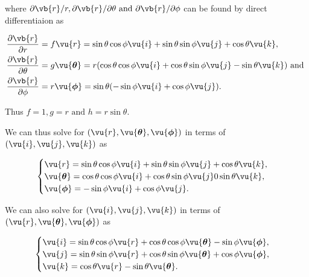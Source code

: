 \documentclass[english,a4paper,12pt]{report}
\begin{document}
where \(\partial \vb{r} /r, \partial \vb{r} /\partial \theta \text { and } \partial \vb{r} /\partial \phi \) can be found by direct differentiaion as 

\begin{equation}
	\begin{aligned} 
		\frac{\partial \vb{r} }{\partial r}   &= f \vu{r} = \sin{\theta}\cos{\phi}\vu{i} + \sin{\theta}\sin{\phi}\vu{j} + \cos{\theta}\vu{k}, \\
		\frac{\partial \vb{r} }{\partial \theta }  &= g \vu{\boldsymbol{\theta }} = r(\cos{\theta}\cos{\phi}\vu{i} + \cos{\theta}\sin{\phi}\vu{j} - \sin{\theta}\vu{k})\text { and }  \\
		\frac{\partial \vb{r} }{\partial \phi }  &= r \vu{\boldsymbol{\phi } } = \sin \theta (-\sin{\phi}\vu{i} + \cos{\phi}\vu{j}). 
	\end{aligned} 
\end{equation}

Thus \(f = 1, g = r \text { and }  h = r\sin \theta \).

We can thus solve for \((\vu{r} , \vu{\boldsymbol{\theta } }, \vu{\boldsymbol{\phi } })\) in terms of \((\vu{i}, \vu{j} ,\vu{k} )\) as 

\begin{equation}
    \begin{cases}
        \vu{r} = \sin \theta \cos \phi  \vu{i}  + \sin \theta \sin \phi  \vu{j}  + \cos \theta  \vu{k},  \\
        \vu{\boldsymbol{\theta } } = \cos \theta \cos \phi \vu{i}  + \cos \theta \sin \phi \vu{j} 0 \sin \theta \vu{k}, \\
        \vu{\boldsymbol{\phi } } = -\sin \phi  \vu{i} + \cos \phi \vu{j}. 
    \end{cases}
\end{equation}



We can also solve for \((\vu{i} , \vu{j}, \vu{k} )\) in terms of \((\vu{r} , \vu{\boldsymbol{\theta } }, \vu{\boldsymbol{\phi } } )\) as  

\begin{equation}
    \begin{cases}
        \vu{i} = \sin \theta \cos \phi \vu{r} + \cos \theta \cos \phi \vu{\boldsymbol{\theta } } - \sin \phi \vu{\boldsymbol{\phi } }, \\
        \vu{j} = \sin \theta \sin \phi \vu{r} + \cos \theta \sin \phi \vu{\boldsymbol{\theta } } + \cos \phi \vu{\boldsymbol{\phi } }, \\
        \vu{k} = \cos \theta \vu{r} - \sin \theta \vu{\boldsymbol{\theta } }.
    \end{cases}
\end{equation}
\end{document}
